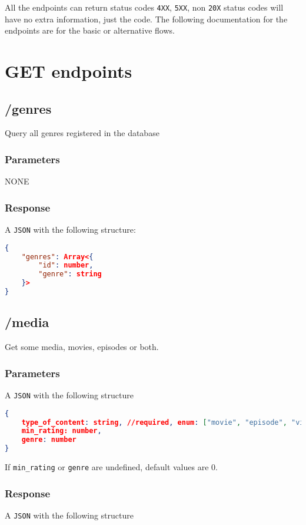 \documentclass{article}
\newcommand{\mono}{\texttt}
\begin{document}
	All the endpoints can return status codes \mono{4XX}, \mono{5XX}, non \mono{20X} status codes will have no extra information, just the code. The following documentation for the endpoints are for the basic or alternative flows.	
	
	\section{GET endpoints}	
	\subsection{/genres}
	
	Query all genres registered in the database
	
	\subsubsection{Parameters}
	NONE
	
	\subsubsection{Response}
	A \mono{JSON} with the following structure:
	
\begin{lstlisting}[language=json]
{
	"genres": Array<{
		"id": number,
		"genre": string
	}>
}
\end{lstlisting}
	

\subsection{/media}
Get some media, movies, episodes or both.

\subsubsection{Parameters}
A \mono{JSON} with the following structure

\begin{lstlisting}[language=json]
{
	type_of_content: string, //required, enum: ["movie", "episode", "video"]
	min_rating: number,
	genre: number
}
\end{lstlisting}

If \mono{min\_rating} or \mono{genre} are undefined, default values are 0.

\subsubsection{Response}
A \mono{JSON} with the following structure
\end{document}
